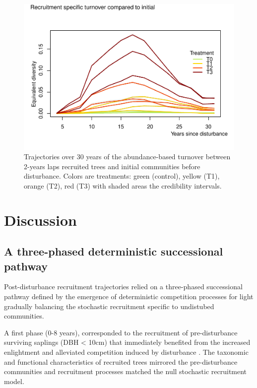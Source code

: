 \documentclass[fleqn,10pt]{ArtEcoFoG} %
\begin{document}
\begin{figure}

{\centering \includegraphics{RecruitmentTrajectories_files/figure-latex/Turnover-1} 

}

\caption{Trajectories over 30 years of the abundance-based turnover between 2-years laps recruited trees and initial communities before disturbance. Colors are treatments: green (control), yellow (T1), orange (T2), red (T3) with shaded areas the credibility intervals.}\label{fig:Turnover}
\end{figure}

\section{Discussion}\label{discussion}

\subsection{A three-phased deterministic successional
pathway}\label{a-three-phased-deterministic-successional-pathway}

Post-disturbance recruitment trajectories relied on a three-phased
successional pathway defined by the emergence of deterministic
competition processes for light gradually balancing the stochastic
recruitment specific to undistubed communities.

A first phase (0-8 years), corresponded to the recruitment of
pre-disturbance surviving saplings (DBH \textless{} 10cm) that
immediately benefited from the increased enlightment and alleviated
competition induced by disturbance \citep{Denslow2000, Herault2010}. The
taxonomic and functional characteristics of recruited trees mirrored the
pre-disturbance communities and recruitment processes matched the null
stochastic recruitment model.
\end{document}
